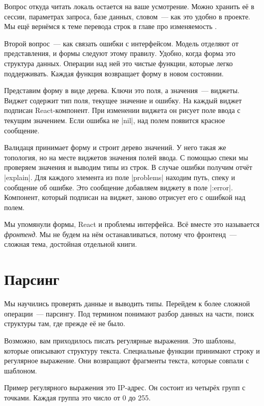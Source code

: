 Вопрос откуда читать локаль остается на ваше усмотрение. Можно хранить е\"{е} в
сессии, параметрах запроса, базе данных, словом~--- как это удобно в проекте. Мы
ещ\"{е} верн\"{е}мся к теме перевода строк в главе про изменяемость .

Второй вопрос~--- как связать ошибки с интерфейсом. Модель отделяют от
представления, и формы следуют этому правилу. Удобно, когда форма это структура
данных. Операции над ней это чистые функции, которые легко поддерживать. Каждая
функция возвращает форму в новом состоянии.

Представим форму в виде дерева. Ключи это поля, а значения~--- виджеты. Виджет
содержит тип поля, текущее значение и ошибку. На каждый виджет подписан
React-компонент. При изменении виджета он рисует поле ввода с текущим
значением. Если ошибка не \spverb|nil|, над полем появится красное сообщение.

Валидаця принимает форму и строит дерево значений. У него такая же топология, но
на месте виджетов значения полей ввода. С помощью спеки мы проверяем значения и
выводим типы из строк. В случае ошибки получим отч\"{е}т \spverb|explain|. Для
каждого элемента из поле \spverb|problems| находим путь, спеку и сообщение об
ошибке. Это сообщение добавляем виджету в поле \spverb|:error|. Компонент,
который подписан на виджет, заново отрисует его с ошибкой над полем.


Мы упомянули формы, React и проблемы интерфейса. Вс\"{е} вместе это называется
\emph{фронтенд}. Мы не будем на н\"{е}м останавливаться, потому что фронтенд~---
сложная тема, достойная отдельной книги.

\section{Парсинг}

Мы научились проверять данные и выводить типы. Перейдем к более сложной
операции~--- парсингу. Под термином понимают разбор данных на части, поиск
структуры там, где прежде е\"{е} не было.

Возможно, вам приходилось писать регулярные выражения. Это шаблоны, которые
описывают структуру текста. Специальные функции принимают строку и регулярное
выражение. Они возвращают фрагменты текста, которые совпали с шаблоном.

Пример регулярного выражения это IP-адрес. Он состоит из четыр\"{е}х групп с
точками. Каждая группа это число от 0 до 255.

